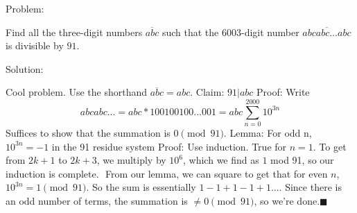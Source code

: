 Problem: 

Find all the three-digit numbers $\overline{abc}$ such that the $6003$-digit number $\overline{abcabc\ldots abc}$ is divisible by $91$.


Solution:

Cool problem. Use the shorthand $\overline{abc}=abc$.
Claim: $91|abc$
Proof: Write$$abcabc...=abc*100100100...001=abc\sum_{n=0}^{2000}10^{3n}$$Suffices to show that the summation is $0\pmod{91}$.
Lemma: For odd n, $10^{3n}=-1$ in the 91 residue system
Proof: Use induction. True for $n=1$. To get from $2k+1$ to $2k+3$, we multiply by $10^6$, which we find as $1$ mod 91, so our induction is complete. $\boxed{}$
From our lemma, we can square to get that for even $n$, $10^{3n}=1\pmod{91}$. So the sum is essentially $1-1+1-1+1...$. Since there is an odd number of terms, the summation is $\ne 0\pmod{91}$, so we’re done.$\blacksquare$
